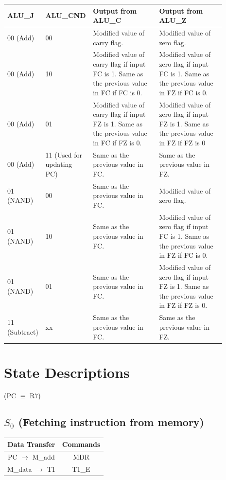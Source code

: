 \documentclass[]{report}
\begin{document}
\begin{table}[ht]
\begin{center}
\begin{tabular}{|p{0.13\linewidth}|p{0.16\linewidth}|p{0.3\linewidth}|p{0.3\linewidth}|}
    \hline
    ALU\_J & ALU\_CND & Output from ALU\_C & Output from ALU\_Z  \\
    \hline
    00 (Add) & 00 & Modified value of carry flag. & Modified value of zero flag. \\
    \hline
    00 (Add) & 10 & Modified value of carry flag if input FC is 1. Same as the previous value in FC if FC is 0. & Modified value of zero flag if input FC is 1. Same as the previous value in FZ if FC is 0. \\
    \hline
    00 (Add) & 01 & Modified value of carry flag if input FZ is 1. Same as the previous value in FC if FZ is 0. & Modified value of zero flag if input FZ is 1. Same as the previous value in FZ if FZ is 0 \\
    \hline
    00 (Add) & 11 (Used for updating PC) & Same as the previous value in FC. & Same as the previous value in FZ. \\
    \hline
    01 (NAND) & 00 & Same as the previous value in FC. & Modified value of zero flag. \\
    \hline
    01 (NAND) & 10 & Same as the previous value in FC. & Modified value of zero flag if input FC is 1. Same as the previous value in FZ if FC is 0. \\
    \hline
    01 (NAND) & 01 & Same as the previous value in FC. & Modified value of zero flag if input FZ is 1. Same as the previous value in FZ if FZ is 0. \\
    \hline
    11 (Subtract) & xx & Same as the previous value in FC. & Same as the previous value in FZ. \\
    \hline
\end{tabular}
\end{center}
\end{table}

\newpage
    \section*{State Descriptions}
        (PC $\equiv$ R7) \\ 
        \subsection*{$S_0$ (Fetching instruction from memory)}  %
            \begin{center}
                \begin{tabular}{|c|c|}
                    \hline
                    Data Transfer & Commands \\
                    \hline
                    PC $\to$ M\_add & MDR\\
                        M\_data $\to$ T1& T1\_E\\
                    \hline
                \end{tabular}
            \end{center}
\end{document}
